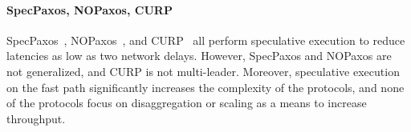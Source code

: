 \paragraph{SpecPaxos, NOPaxos, CURP}
SpecPaxos~\cite{ports2015designing}, NOPaxos~\cite{li2016just}, and
CURP~\cite{park2019exploiting} all perform speculative execution to reduce
latencies as low as two network delays. However, SpecPaxos and NOPaxos are not
generalized, and CURP is not multi-leader. Moreover, speculative execution on
the fast path significantly increases the complexity of the protocols, and none
of the protocols focus on disaggregation or scaling as a means to increase
throughput.
